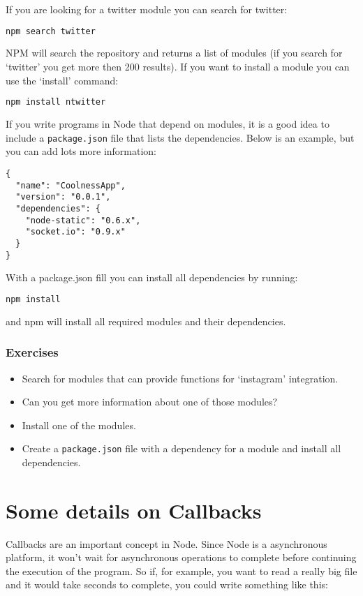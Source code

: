 \documentclass[a4paper]{report}
\begin{document}
If you are looking for a twitter module you can search for twitter: 
\begin{lstlisting}[language=bash] 
npm search twitter 
\end{lstlisting} 
NPM will search the repository and returns a list of modules (if you search for `twitter' you get more then 200 results). If you want to install a module you can use the `install' command: 
\begin{lstlisting}[language=bash] 
npm install ntwitter 
\end{lstlisting} 
If you write programs in Node that depend on modules, it is a good idea to include a \texttt{package.json} file that lists the dependencies. Below is an example, but you can add lots more information: 
\begin{lstlisting} 
{ 
  "name": "CoolnessApp", 
  "version": "0.0.1", 
  "dependencies": { 
    "node-static": "0.6.x", 
    "socket.io": "0.9.x" 
  } 
} 
\end{lstlisting} 
 
\noindent With a package.json fill you can install all dependencies by running: 
\begin{lstlisting}[language=bash] 
npm install 
\end{lstlisting} 
\noindent and npm will install all required modules and their dependencies. 
 
\subsubsection*{Exercises} 
\begin{itemize} 
	\item Search for modules that can provide functions for `instagram' integration. 
	\item Can you get more information about one of those modules? 
	\item Install one of the modules. 
	\item Create a \texttt{package.json} file with a dependency for a module and install all dependencies. 
\end{itemize} 
 
\section*{Some details on Callbacks} 
Callbacks are an important concept in Node. Since Node is a asynchronous platform, it won't wait for asynchronous operations to complete before continuing the execution of the program. So if, for example, you want to read a really big file and it would take seconds to complete, you could write something like this:
\end{document}
